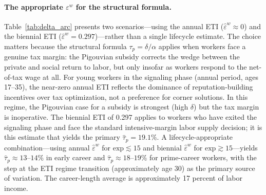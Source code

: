 \documentclass[12pt]{article}
\theoremstyle{definition}
\theoremstyle{remark}
\begin{document}
\paragraph{The appropriate $\varepsilon^w$ for the structural formula.}
Table~\ref{tab:delta_arc} presents two scenarios—using the annual ETI ($\hat{\varepsilon}^w
\approx 0$) and the biennial ETI ($\hat{\varepsilon}^w = 0.297$)—rather than a single
lifecycle estimate. The choice matters because the structural formula $\tau_p = \delta/\alpha$
applies when workers face a genuine tax margin: the Pigouvian subsidy corrects the wedge
between the private and social return to labor, but only insofar as workers respond to the
net-of-tax wage at all. For young workers in the signaling phase (annual period, ages 17--35),
the near-zero annual ETI reflects the dominance of reputation-building incentives over tax
optimization, not a preference for corner solutions. In this regime, the Pigouvian case for
a subsidy is strongest (high $\delta$) but the tax margin is inoperative. The biennial ETI
of 0.297 applies to workers who have exited the signaling phase and face the standard
intensive-margin labor supply decision; it is this estimate that yields the primary $\hat{\tau}_p
= 19.1\%$. A lifecycle-appropriate combination—using annual $\hat{\varepsilon}^w$ for
$\text{exp} \lesssim 15$ and biennial $\hat{\varepsilon}^w$ for $\text{exp} \gtrsim 15$—yields
$\hat{\tau}_p \approx 13$--$14\%$ in early career and $\hat{\tau}_p \approx 18$--$19\%$ for
prime-career workers, with the step at the ETI regime transition (approximately age 30)
as the primary source of variation. The career-length average is approximately 17 percent of
labor income.
\end{document}
